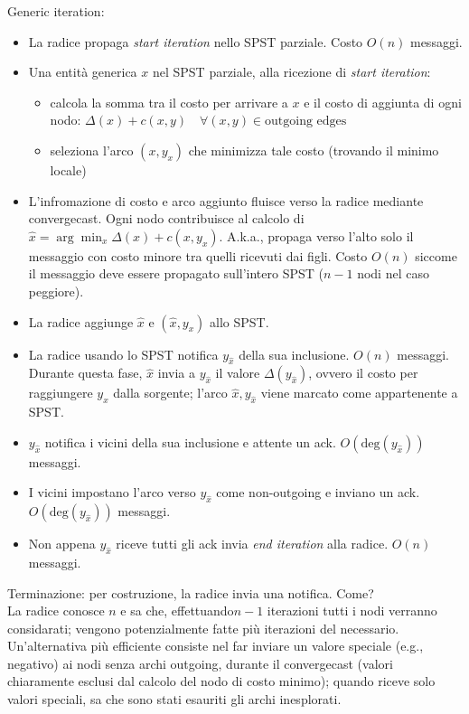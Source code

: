 Generic iteration:
\begin{itemize}
 \item La radice propaga \textit{start iteration} nello SPST parziale. Costo $O(n)$ messaggi.
 \item Una entità generica $x$ nel SPST parziale, alla ricezione di \textit{start iteration}:
 \begin{itemize}
    \item calcola la somma tra il costo per arrivare a $x$ e il costo di aggiunta di ogni nodo: $\Delta(x) + c(x, y) \quad \forall (x, y) \in \text{outgoing edges}$
    \item seleziona l'arco $(x, y_x)$ che minimizza tale costo (trovando il minimo locale)
 \end{itemize}
 \item L'infromazione di costo e arco aggiunto fluisce verso la radice mediante convergecast. Ogni nodo contribuisce al calcolo di $\hat x = \arg \min_x \Delta(x) + c(x, y_x)$.
 A.k.a., propaga verso l'alto solo il messaggio con costo minore tra quelli ricevuti dai figli. Costo $O(n)$ siccome il messaggio deve essere propagato sull'intero
 SPST ($n-1$ nodi nel caso peggiore).
 \item La radice aggiunge $\hat x$ e $(\hat x, y_x)$ allo SPST.
 \item La radice usando lo SPST notifica $y_{\hat x}$ della sua inclusione. $O(n)$ messaggi. Durante questa fase, $\hat x$ invia a $y_{\hat x}$ il valore
 $\Delta(y_{\hat x})$, ovvero il costo per raggiungere $y_{\hat x}$ dalla sorgente; l'arco $\hat x, y_{\hat x}$ viene marcato come appartenente a SPST.
 \item $y_{\hat x}$ notifica i vicini della sua inclusione e attente un ack. $O(\text{deg}(y_{\hat x}))$ messaggi.
 \item I vicini impostano l'arco verso $y_{\hat x}$ come non-outgoing e inviano un ack. $O(\text{deg}(y_{\hat x}))$ messaggi.
 \item Non appena $y_{\hat x}$ riceve tutti gli ack invia \textit{end iteration} alla radice. $O(n)$ messaggi.
\end{itemize}

Terminazione: per costruzione, la radice invia una notifica. Come?\\
La radice conosce $n$ e sa che, effettuando$n-1$ iterazioni tutti i nodi verranno considarati; vengono potenzialmente fatte più iterazioni del necessario.
Un'alternativa più efficiente consiste nel far inviare un valore speciale (e.g., negativo) ai nodi senza archi outgoing, durante il convergecast (valori chiaramente
esclusi dal calcolo del nodo di costo minimo); quando riceve solo valori speciali, sa che sono stati esauriti gli archi inesplorati.


